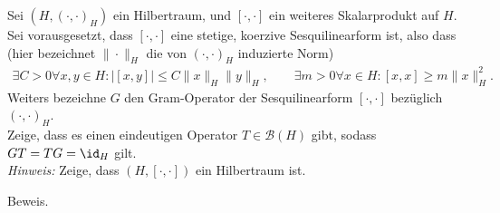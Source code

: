 \begin{exercise}
Sei $(H,(\cdot,\cdot)_H)$ ein Hilbertraum, und $[\cdot,\cdot]$ ein weiteres Skalarprodukt
auf $H$. Sei vorausgesetzt, dass $[\cdot,\cdot]$ eine stetige, koerzive Sesquilinearform
ist, also dass (hier bezeichnet $\|\cdot\|_H$ die von $(\cdot,\cdot)_H$ induzierte Norm)
\begin{align*}
  \exists C > 0 \forall x,y \in H: |[x,y]| \leq C\|x\|_H\|y\|_H, \qquad
  \exists m > 0 \forall x \in H: [x,x] \geq m\|x\|_H^2.
\end{align*}
Weiters bezeichne $G$ den Gram-Operator der Sesquilinearform $[\cdot,\cdot]$
bezüglich $(\cdot,\cdot)_H$. \\
Zeige, dass es einen eindeutigen Operator $T \in \mathcal{B}(H)$ gibt, sodass
$GT = TG = \id_H $ gilt. \\
\textit{Hinweis:} Zeige, dass $(H,[\cdot,\cdot])$ ein Hilbertraum ist.
\end{exercise}
\begin{solution}
Beweis.

\end{solution}
